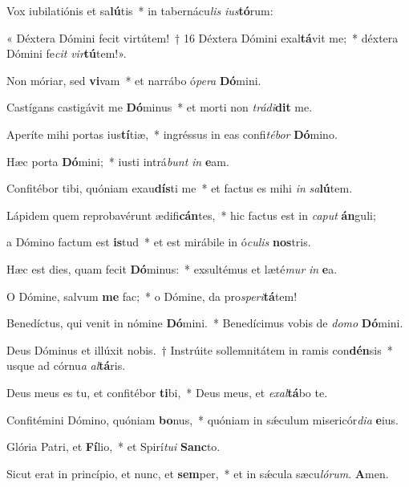 \item Vox iubilatiónis et sa\textbf{lú}tis~* in tabernácu\textit{lis} \textit{ius}\textbf{tó}rum:

\item « Déxtera Dómini fecit virtútem!~† 16 Déxtera Dómini exal\textbf{tá}vit me;~* déxtera Dómini fe\textit{cit} \textit{vir}\textbf{tú}tem!».

\item Non móriar, sed \textbf{vi}vam~* et narrábo ó\textit{pera} \textbf{Dó}mini.

\item Castígans castigávit me \textbf{Dó}minus~* et morti non \textit{trádi}\textbf{dit} me.

\item Aperíte mihi portas ius\textbf{tí}tiæ,~* ingréssus in eas confi\textit{tébor} \textbf{Dó}mino.

\item Hæc porta \textbf{Dó}mini;~* iusti intrá\textit{bunt} \textit{in} \textbf{e}am.

\item Confitébor tibi, quóniam exau\textbf{dís}ti me~* et factus es mihi \textit{in} \textit{sa}\textbf{lú}tem.

\item Lápidem quem reprobavérunt ædifi\textbf{cán}tes,~* hic factus est in \textit{caput} \textbf{án}guli;

\item a Dómino factum est \textbf{is}tud~* et est mirábile in ó\textit{culis} \textbf{nos}tris.

\item Hæc est dies, quam fecit \textbf{Dó}minus:~* exsultémus et læté\textit{mur} \textit{in} \textbf{e}a.

\item O Dómine, salvum \textbf{me} fac;~* o Dómine, da pro\textit{speri}\textbf{tá}tem!

\item Benedíctus, qui venit in nómine \textbf{Dó}mini.~* Benedícimus vobis de \textit{domo} \textbf{Dó}mini.

\item Deus Dóminus et illúxit nobis.~† Instrúite sollemnitátem in ramis con\textbf{dén}sis~* usque ad córnu\textit{a} \textit{al}\textbf{tá}ris.

\item Deus meus es tu, et confitébor \textbf{ti}bi,~* Deus meus, et \textit{exal}\textbf{tá}bo te.

\item Confitémini Dómino, quóniam \textbf{bo}nus,~* quóniam in sǽculum misericór\textit{dia} \textbf{e}ius.

\item Glória Patri, et \textbf{Fí}lio,~* et Spirí\textit{tui} \textbf{Sanc}to.

\item Sicut erat in princípio, et nunc, et \textbf{sem}per,~* et in sǽcula sæcu\textit{lórum}. \textbf{A}men.


